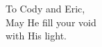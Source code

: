 \label{chap:dedication}

\begin{center}
  \null
  \vspace{2.7in}
  \bigskip
  To Cody and Eric,\\
  May He fill your void\\
  with His light.\\
  \newpage
\end{center}

